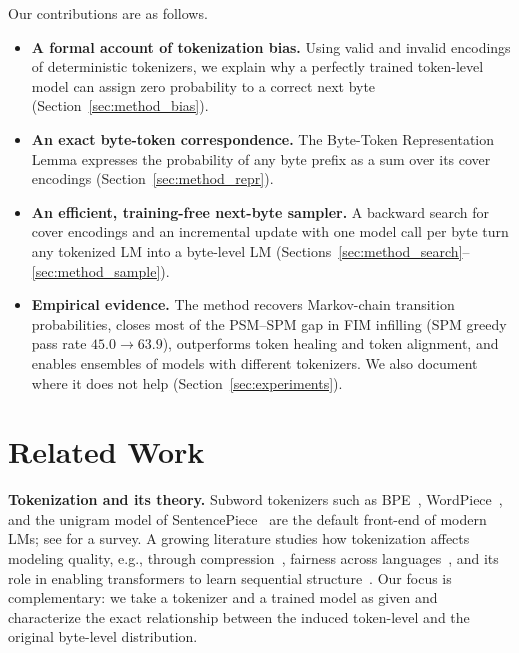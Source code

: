 \documentclass{article} %
\begin{document}
Our contributions are as follows.
\begin{itemize}
\item \textbf{A formal account of tokenization bias.} Using valid and invalid encodings of deterministic tokenizers, we explain why a perfectly trained token-level model can assign zero probability to a correct next byte (Section~\ref{sec:method_bias}).
\item \textbf{An exact byte-token correspondence.} The Byte-Token Representation Lemma expresses the probability of any byte prefix as a sum over its cover encodings (Section~\ref{sec:method_repr}).
\item \textbf{An efficient, training-free next-byte sampler.} A backward search for cover encodings and an incremental update with one model call per byte turn any tokenized LM into a byte-level LM (Sections~\ref{sec:method_search}--\ref{sec:method_sample}).
\item \textbf{Empirical evidence.} The method recovers Markov-chain transition probabilities, closes most of the PSM--SPM gap in FIM infilling (SPM greedy pass rate $45.0\rightarrow63.9$), outperforms token healing and token alignment, and enables ensembles of models with different tokenizers. We also document where it does not help (Section~\ref{sec:experiments}).
\end{itemize}

\section{Related Work}
\label{sec:related_work}
\textbf{Tokenization and its theory.}
Subword tokenizers such as BPE~\citep{gage1994bpe,sennrich2016bpe}, WordPiece~\citep{schuster2012wordpiece,wu2016gnmt}, and the unigram model of SentencePiece~\citep{kudo2018subword,kudo2018sentencepiece} are the default front-end of modern LMs; see \citet{mielke2021between} for a survey. A growing literature studies how tokenization affects modeling quality, e.g., through compression~\citep{zouhar2023tokenization,bostrom2020bpe}, fairness across languages~\citep{petrov2023unfairness}, and its role in enabling transformers to learn sequential structure~\citep{rajaraman2024theory}. Our focus is complementary: we take a tokenizer and a trained model as given and characterize the exact relationship between the induced token-level and the original byte-level distribution.
\end{document}
